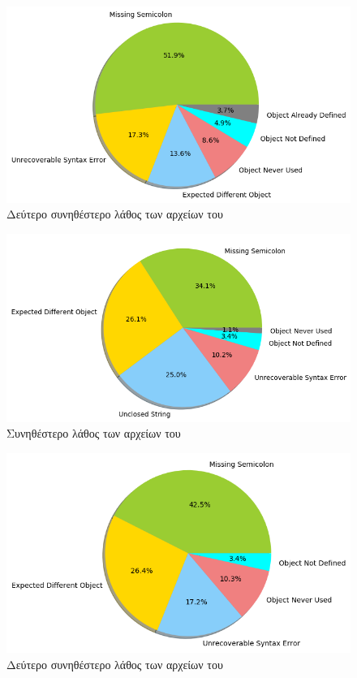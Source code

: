 \begin{figure}[!htb]
	\caption{Δεύτερο συνηθέστερο λάθος των αρχείων του }
	\label{MCE2-githubchar}
	\includegraphics[width=\textwidth, keepaspectratio]{images/MCE2-githubchar.png}
\end{figure}

\begin{figure}[!htb]
	\caption{Συνηθέστερο λάθος των αρχείων του }
	\label{MCE1-githubLabeled}
	\includegraphics[width=\textwidth, keepaspectratio]{images/MCE-githubLabeled.png}
\end{figure}

\begin{figure}[!htb]
	\caption{Δεύτερο συνηθέστερο λάθος των αρχείων του }
	\label{MCE2-githubLabeled}
	\includegraphics[width=\textwidth, keepaspectratio]{images/MCE2-githubLabeled.png}
\end{figure}

